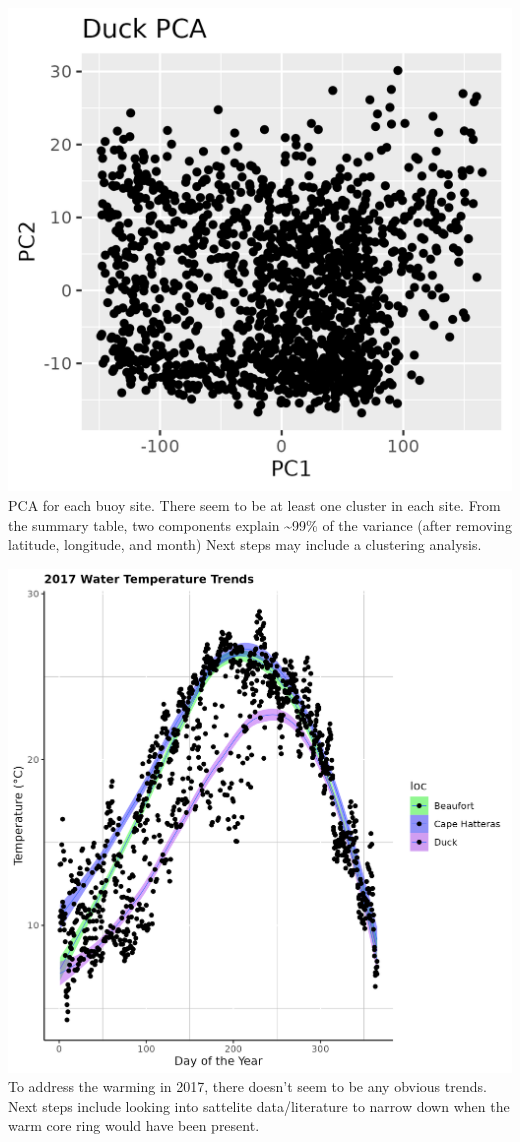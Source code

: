 \documentclass[
]{article}
\begin{document}
\includegraphics{figures/duckpca.png} PCA for each buoy site. There seem
to be at least one cluster in each site. From the summary table, two
components explain \textasciitilde99\% of the variance (after removing
latitude, longitude, and month) Next steps may include a clustering
analysis.

\includegraphics{figures/2017trend.png} To address the warming in 2017,
there doesn't seem to be any obvious trends. Next steps include looking
into sattelite data/literature to narrow down when the warm core ring
would have been present.
\end{document}
